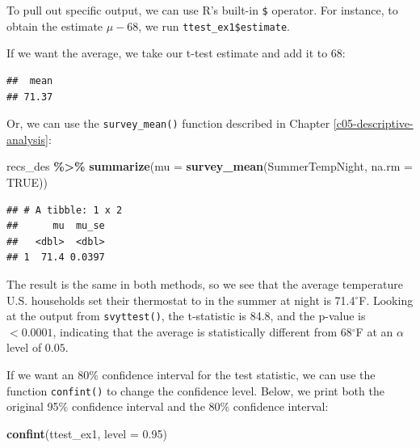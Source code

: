 \documentclass[
]{krantz}
\makeatletter
\newenvironment{Shaded}{\begin{snugshade}}{\end{snugshade}}
\newcommand{\AttributeTok}[1]{\textcolor[rgb]{0.27,0.27,0.27}{#1}}
\newcommand{\ConstantTok}[1]{\textcolor[rgb]{0.37,0.37,0.37}{#1}}
\newcommand{\DecValTok}[1]{\textcolor[rgb]{0.06,0.06,0.06}{#1}}
\newcommand{\FloatTok}[1]{\textcolor[rgb]{0.06,0.06,0.06}{#1}}
\newcommand{\FunctionTok}[1]{\textcolor[rgb]{0.27,0.27,0.27}{\textbf{#1}}}
\newcommand{\NormalTok}[1]{#1}
\newcommand{\SpecialCharTok}[1]{\textcolor[rgb]{0.43,0.43,0.43}{\textbf{#1}}}
\newenvironment{kframe}{%
\medskip{}
\setlength{\fboxsep}{.8em}
 \def\at@end@of@kframe{}%
 \ifinner\ifhmode%
  \def\at@end@of@kframe{\end{minipage}}%
  \begin{minipage}{\columnwidth}%
 \fi\fi%
 \def\FrameCommand##1{\hskip\@totalleftmargin \hskip-\fboxsep
 \colorbox{shadecolor}{##1}\hskip-\fboxsep
     \hskip-\linewidth \hskip-\@totalleftmargin \hskip\columnwidth}%
 \MakeFramed {\advance\hsize-\width
   \@totalleftmargin\z@ \linewidth\hsize
   \@setminipage}}%
 {\par\unskip\endMakeFramed%
 \at@end@of@kframe}
\renewenvironment{Shaded}{\begin{kframe}}{\end{kframe}}
\makeatother
\begin{document}
To pull out specific output, we can use R's built-in \texttt{\$} operator. For instance, to obtain the estimate \(\mu - 68\), we run \texttt{ttest\_ex1\$estimate}.

If we want the average, we take our t-test estimate and add it to 68:

\begin{Shaded}
\end{Shaded}

\begin{verbatim}
##  mean 
## 71.37
\end{verbatim}

Or, we can use the \texttt{survey\_mean()} function described in Chapter \ref{c05-descriptive-analysis}:

\begin{Shaded}
\begin{Highlighting}[]
\NormalTok{recs\_des }\SpecialCharTok{\%\textgreater{}\%}
  \FunctionTok{summarize}\NormalTok{(}\AttributeTok{mu =} \FunctionTok{survey\_mean}\NormalTok{(SummerTempNight, }\AttributeTok{na.rm =} \ConstantTok{TRUE}\NormalTok{))}
\end{Highlighting}
\end{Shaded}

\begin{verbatim}
## # A tibble: 1 x 2
##      mu  mu_se
##   <dbl>  <dbl>
## 1  71.4 0.0397
\end{verbatim}

The result is the same in both methods, so we see that the average temperature U.S. households set their thermostat to in the summer at night is 71.4\(^\circ\)F. Looking at the output from \texttt{svyttest()}, the t-statistic is 84.8, and the p-value is \(<0.0001\), indicating that the average is statistically different from 68\(^\circ\)F at an \(\alpha\) level of \(0.05\).

If we want an 80\% confidence interval for the test statistic, we can use the function \texttt{confint()} to change the confidence level. Below, we print both the original 95\% confidence interval and the 80\% confidence interval:

\begin{Shaded}
\begin{Highlighting}[]
\FunctionTok{confint}\NormalTok{(ttest\_ex1, }\AttributeTok{level =} \FloatTok{0.95}\NormalTok{)}
\end{Highlighting}
\end{Shaded}
\end{document}
